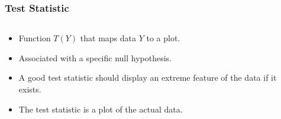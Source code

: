 \documentclass{beamer}
\begin{document}
\begin{frame}
  \frametitle{Test Statistic}
  
	\begin{columns}
	
		\begin{column}{0.4\textwidth}
		  \begin{itemize}
			  \item Function $T(Y)$ that maps data $Y$ to a plot.
			  \item Associated with a specific null hypothesis.
			  \item A good test statistic should display an extreme feature of the data if it exists.
			  \item The test statistic is a plot of the actual data.		
		 \end{itemize}		
		\end{column}
		
		\begin{column}{0.6\textwidth}
			 \begin{center}  \end{center}
		\end{column}
		
	\end{columns} 
	
\end{frame}
\end{document}
